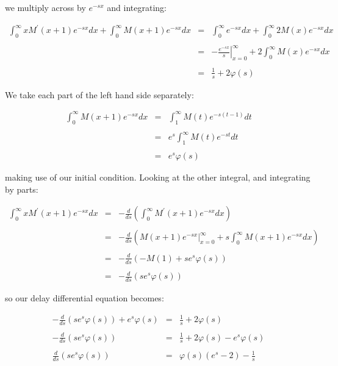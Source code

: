 we multiply across by $e^{-sx}$ and integrating: \bigskip

\begin{eqnarray*}
	\int_{0}^{\infty} x M^{\prime}(x + 1) e^{-sx} dx + \int_{0}^{\infty} M(x + 1) e^{-sx} dx & = & \int_{0}^{\infty} e^{-sx} dx + \int_{0}^{\infty} 2 M(x) e^{-sx} dx \\\\
																							 & = & \left. -\frac{ e^{-sx}}{s} \right|_{x = 0}^{\infty} + 2 \int_{0}^{\infty} M(x) e^{-sx} dx \\\\
																							 & = & \frac{1}{s} + 2 \varphi(s) 
\end{eqnarray*}\medskip

We take each part of the left hand side separately: \bigskip

\begin{eqnarray*}
	\int_{0}^{\infty} M(x + 1) e^{-sx} dx & = & \int_{1}^{\infty} M(t) e^{-s(t - 1)} dt \\\\
										  & = & e^{s} \int_{1}^{\infty} M(t) e^{-st} dt \\\\
										  & = & e^{s} \varphi(s) 
\end{eqnarray*}\medskip

making use of our initial condition. Looking at the other integral, and integrating by parts: \bigskip

\begin{eqnarray*}
	\int_{0}^{\infty} x M^{\prime}(x + 1) e^{-sx} dx & = & - \frac{d}{ds} \left( \int_{0}^{\infty} M^{\prime}(x + 1) e^{-sx} dx \right) \\\\
													 & = & - \frac{d}{ds} \left( \left. M(x + 1) e^{-sx} \right|_{x = 0}^{\infty} + s \int_{0}^{\infty} M(x + 1) e^{-sx} dx \right) \\\\
													 & = & - \frac{d}{ds} \left( - M(1) + s e^{s} \varphi(s) \right) \\\\
													 & = & - \frac{d}{ds} \left( s e^{s} \varphi(s) \right) 
\end{eqnarray*}\medskip

so our delay differential equation becomes: \bigskip

\begin{eqnarray*}
	- \frac{d}{ds} \left( s e^{s} \varphi(s) \right) + e^{s} \varphi(s) & = & \frac{1}{s} + 2 \varphi(s) \\\\
					   - \frac{d}{ds} \left( s e^{s} \varphi(s) \right) & = & \frac{1}{s} + 2 \varphi(s) - e^{s} \varphi(s) \\\\
						 \frac{d}{ds} \left( s e^{s} \varphi(s) \right) & = & \varphi(s) ( e^{s} - 2 ) - \frac{1}{s}
\end{eqnarray*}\medskip


